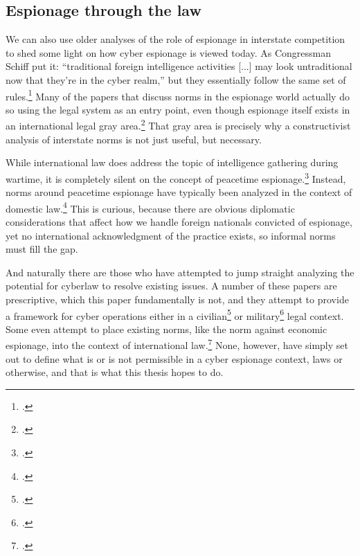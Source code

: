 \documentclass{report}
\begin{document}
\begin{refsegment}
\subsection{Espionage through the law}
We can also use older analyses of the role of espionage in interstate competition to shed some light on how cyber espionage is viewed today. As Congressman Schiff put it: ``traditional foreign intelligence activities [...] may look untraditional now that they’re in the cyber realm,'' but they essentially follow the same set of rules.\footcite{nakashima_hacks_2015} Many of the papers that discuss norms in the espionage world actually do so using the legal system as an entry point, even though espionage itself exists in an international legal gray area.\footcite{beim_enforcing_2018} That gray area is precisely why a constructivist analysis of interstate norms is not just useful, but necessary.

While international law does address the topic of intelligence gathering during wartime, it is completely silent on the concept of peacetime espionage.\footcite{radsan_unresolved_2007} Instead, norms around peacetime espionage have typically been analyzed in the context of domestic law.\footcite{demarest_espionage_1995} This is curious, because there are obvious diplomatic considerations that affect how we handle foreign nationals convicted of espionage, yet no international acknowledgment of the practice exists, so informal norms must fill the gap.

And naturally there are those who have attempted to jump straight analyzing the potential for cyberlaw to resolve existing issues. A number of these papers are prescriptive, which this paper fundamentally is not, and they attempt to provide a framework for cyber operations either in a civilian\footcite{yurcik_internet_2001} or military\footcite{kehler_rules_2017} legal context. Some even attempt to place existing norms, like the norm against economic espionage, into the context of international law.\footcite{lotrionte_countering_2015} None, however, have simply set out to define what is or is not permissible in a cyber espionage context, laws or otherwise, and that is what this thesis hopes to do.





\end{refsegment}
\end{document}
